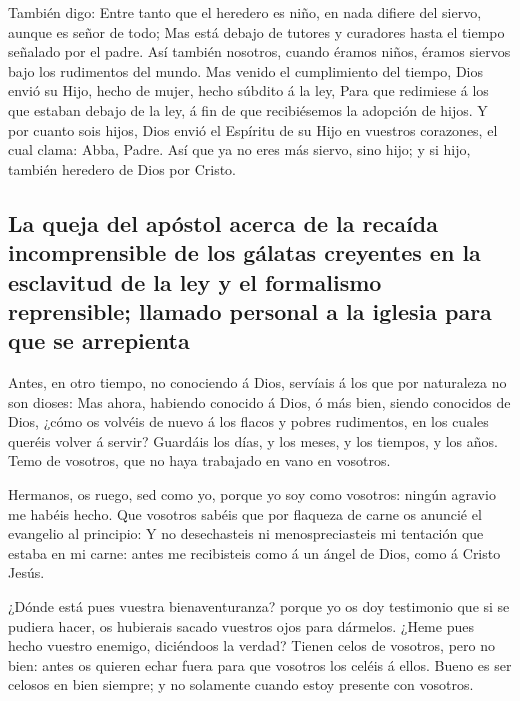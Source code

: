  También digo: Entre tanto que el heredero es niño, en nada
difiere del siervo, aunque es señor de todo;  Mas está
debajo de tutores y curadores hasta el tiempo señalado por el padre.
 Así también nosotros, cuando éramos niños, éramos siervos
bajo los rudimentos del mundo.  Mas venido el cumplimiento
del tiempo, Dios envió su Hijo, hecho de mujer, hecho súbdito á la ley,
 Para que redimiese á los que estaban debajo de la ley, á
fin de que recibiésemos la adopción de hijos.  Y por cuanto
sois hijos, Dios envió el Espíritu de su Hijo en vuestros corazones, el
cual clama: Abba, Padre.  Así que ya no eres más siervo,
sino hijo; y si hijo, también heredero de Dios por Cristo.

\hypertarget{la-queja-del-apuxf3stol-acerca-de-la-recauxedda-incomprensible-de-los-guxe1latas-creyentes-en-la-esclavitud-de-la-ley-y-el-formalismo-reprensible-llamado-personal-a-la-iglesia-para-que-se-arrepienta}{%
\subsection{La queja del apóstol acerca de la recaída incomprensible de
los gálatas creyentes en la esclavitud de la ley y el formalismo
reprensible; llamado personal a la iglesia para que se
arrepienta}\label{la-queja-del-apuxf3stol-acerca-de-la-recauxedda-incomprensible-de-los-guxe1latas-creyentes-en-la-esclavitud-de-la-ley-y-el-formalismo-reprensible-llamado-personal-a-la-iglesia-para-que-se-arrepienta}}

 Antes, en otro tiempo, no conociendo á Dios, servíais á los
que por naturaleza no son dioses:  Mas ahora, habiendo
conocido á Dios, ó más bien, siendo conocidos de Dios, ¿cómo os volvéis
de nuevo á los flacos y pobres rudimentos, en los cuales queréis volver
á servir?  Guardáis los días, y los meses, y los tiempos, y
los años.  Temo de vosotros, que no haya trabajado en vano
en vosotros.

 Hermanos, os ruego, sed como yo, porque yo soy como
vosotros: ningún agravio me habéis hecho.  Que vosotros
sabéis que por flaqueza de carne os anuncié el evangelio al principio:
 Y no desechasteis ni menospreciasteis mi tentación que
estaba en mi carne: antes me recibisteis como á un ángel de Dios, como á
Cristo Jesús.

 ¿Dónde está pues vuestra bienaventuranza? porque yo os doy
testimonio que si se pudiera hacer, os hubierais sacado vuestros ojos
para dármelos.  ¿Heme pues hecho vuestro enemigo,
diciéndoos la verdad?  Tienen celos de vosotros, pero no
bien: antes os quieren echar fuera para que vosotros los celéis á ellos.
 Bueno es ser celosos en bien siempre; y no solamente
cuando estoy presente con vosotros.

